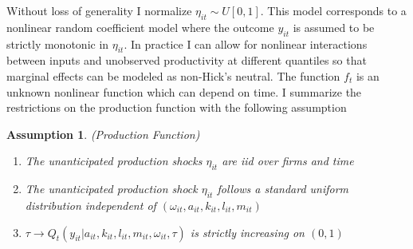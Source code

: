 \documentclass{article}
\newtheorem{assump}{Assumption}[section]
\begin{document}
Without loss of generality I normalize $\eta_{it}\sim U[0,1]$. This model corresponds to a nonlinear random coefficient model where the outcome $y_{it}$ is assumed to be strictly monotonic in $\eta_{it}$. In practice I can allow for nonlinear interactions between inputs and unobserved productivity at different quantiles so that marginal effects can be modeled as non-Hick's neutral. The function $f_{t}$ is an unknown nonlinear function which can depend on time. I summarize the restrictions on the production function with the following assumption
\begin{assump} (Production Function) \label{pf1}
~
\begin{enumerate}[label=(\alph*)]
	\item The unanticipated production shocks $\eta_{it}$ are iid over firms and time 
    \item The unanticipated production shock $\eta_{it}$ follows a standard uniform distribution independent of $(\omega_{it}, a_{it}, k_{it}, l_{it}, m_{it})$
    \item $\tau\rightarrow Q_{t}(y_{it}|a_{it}, k_{it}, l_{it}, m_{it}, \omega_{it}, \tau)$ is strictly increasing on $(0,1)$
\end{enumerate}
\end{assump}
\end{document}
